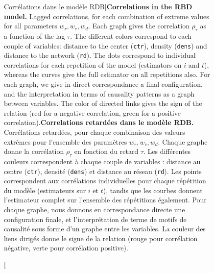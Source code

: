 \begin{figure}
\caption[Correlation in the RBD model][Corrélations dans le modèle RDB]{\textbf{Correlations in the RBD model.} Lagged correlations, for each combination of extreme values for all parameters $w_r,w_c,w_d$. Each graph gives the correlation $\rho_{\tau}$ as a function of the lag $\tau$. The different colors correspond to each couple of variables: distance to the center (\texttt{ctr}), density (\texttt{dens}) and distance to the network (\texttt{rd}). The dots correspond to individual correlations for each repetition of the model (estimators on $i$ and $t$), whereas the curves give the full estimator on all repetitions also. For each graph, we give in direct correspondance a final configuration, and the interpretation in terms of causality patterns as a graph between variables. The color of directed links gives the sign of the relation (red for a negative correlation, green for a positive correlation).\label{fig:causalityregimes:exrdb}}{\textbf{Correlations retardées dans le modèle RDB.} Corrélations retardées, pour chaque combinaison des valeurs extrêmes pour l'ensemble des paramètres $w_r,w_c,w_d$. Chaque graphe donne la corrélation $\rho_{\tau}$ en fonction du retard $\tau$. Les différentes couleurs correspondent à chaque couple de variables : distance au centre (\texttt{ctr}), densité (\texttt{dens}) et distance au réseau (\texttt{rd}). Les points correspondent aux corrélations individuelles pour chaque répétition du modèle (estimateurs sur $i$ et $t$), tandis que les courbes donnent l'estimateur complet sur l'ensemble des répétitions également. Pour chaque graphe, nous donnons en correspondance directe une configuration finale, et l'interprétation de terme de motifs de causalité sous forme d'un graphe entre les variables. La couleur des liens dirigés donne le signe de la relation (rouge pour corrélation négative, verte pour corrélation positive).\label{fig:causalityregimes:exrdb}}
\end{figure}




